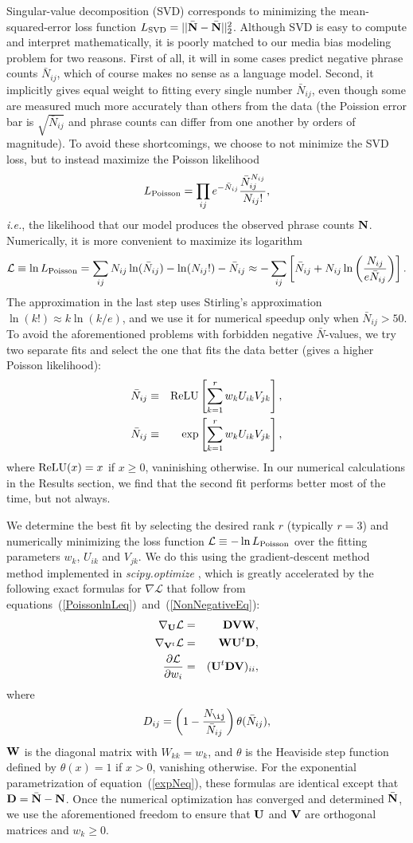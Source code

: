 \documentclass[10pt,letterpaper]{article}
\def\ie{{\frenchspacing\it i.e.}}
\def\relu{{\rm ReLU}}
\def\D{{\bf D}}
\def\Ell{{\mathcal L}}
\def\M{{\bar\N}}
\def\Mhat{\M}
\def\N{{\bf N}}
\def\Nbar{{\bar N}}
\def\Nbarhat{{\Nbar}}
\def\Nbarhatb{{{\bar\N}}}
\def\U{{\bf U}}
\def\V{{\bf V}}
\def\W{{\bf W}}
\def\beq#1{\begin{equation}\label{#1}}
\def\eeq{\end{equation}}
\def\beqa#1{\begin{eqnarray}\label{#1}}
\def\eeqa{\end{eqnarray}}
\def\eq#1{equation~(\ref{#1})}
\def\eqnum#1{~(\ref{#1})}
\begin{document}
Singular-value decomposition (SVD) corresponds to minimizing the mean-squared-error 
loss function
$L_{\rm SVD}=||\Mhat-\M||_2^2$. Although SVD is easy to compute and interpret mathematically, it is poorly matched to our media bias modeling problem for two reasons. 
 First of all, it will in some cases predict negative phrase counts $\Nbarhat_{ij}$, which of course makes no sense as a language model.
Second, it implicitly gives equal weight to fitting every single number $\Nbar _{ij}$, even though some are measured much more accurately than others from the data (the Poission error bar is  
 $\sqrt{\Nbar _{ij}}$ and phrase counts can differ from one another by orders of magnitude). 
To avoid these shortcomings, we choose to not minimize the SVD loss, but to instead maximize the Poisson likelihood
\beq{PoissonLeq}
L_{\rm Poisson}=\prod_{ij} e^{-\Nbar _{ij}}{\Nbar _{ij}^{N _{ij}}\over N _{ij}!},
\eeq
\ie, the likelihood that our model produces the observed phrase counts $\N$. Numerically, it is more convenient to maximize its logarithm 
\beq{PoissonlnLeq}
\Ell\equiv \ln L_{\rm Poisson}= \sum_{ij} N _{ij}\ln({\Nbar _{ij}) - \ln(N _{ij}!})- \Nbar _{ij}
\approx
-\sum_{ij}\left[\Nbar_{ij}  +  N _{ij} \ln\left({N _{ij}\over e\Nbar_{ij}}\right)\right].
\eeq
The approximation in the last step uses
 Stirling's approximation $\ln(k!)\approx k\ln(k/e)$, and we use it for numerical speedup
 only when $\Nbar _{ij}>50$.
 To avoid the aforementioned problems with forbidden negative $\Nbar$-values, we 
 try two separate fits and select the one that fits the data better (gives a higher Poisson likelihood):
\beqa{NonNegativeEq}
\Nbarhat_{ij}&\equiv&\relu\left[\sum_{k=1}^r w_k U_{ik}V_{jk}\right],\\
\Nbarhat_{ij}&\equiv&\exp\left[ \sum_{k=1}^r w_k U_{ik}V_{jk}\right],\label{expNeq}
\eeqa
where $\relu(x)=x$ if $x\ge 0$, vaninishing otherwise.
In our numerical calculations in the Results section, we find that the second fit performs better most of the time, but not always.

We determine the best fit by selecting the desired rank $r$ (typically $r=3$) and numerically minimizing the loss function
$\Ell\equiv -\ln L_{\rm Poisson}$ over the fitting parameters $w_k$, $U_{ik}$ and $V_{jk}$.
We do this using the gradient-descent method method implemented in {\it scipy.optimize}
\cite{virtanen2020scipy},
which is greatly accelerated by the following exact formulas for $\nabla\Ell$ that follow from equations\eqnum{PoissonlnLeq}~and\eqnum{NonNegativeEq}: 
\beqa{GradientEq}
\nabla_\U \Ell&=&\D\V\W,\\
\nabla_{\V^t} \Ell&=&\W\U^t\D,\\
{\partial\Ell\over\partial w_i}&=&(\U^t\D\V)_{ii},
\eeqa
where 
\beq{DdefEq}
D_{ij} = \left(1-{N_{\ij}\over\Nbarhat_{ij}}\right)\theta(\Nbarhat_{ij}),
\eeq
$\W$ is the diagonal matrix with $W_{kk}=w_k$, 
and $\theta$ is the Heaviside step function defined by $\theta(x)=1$ if $x>0$, vanishing otherwise.
For the exponential parametrization of \eq{expNeq}, these formulas are identical except that $\D=\Nbarhatb-\N$.
Once the numerical optimization has converged and determined $\Mhat$, we use the aforementioned freedom to ensure that $\U$ and $\V$ are orthogonal matrices and $w_k\ge 0$.
\end{document}

